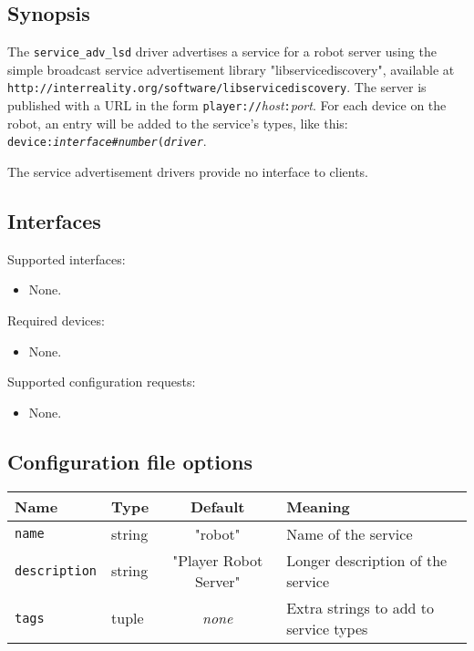 
\subsection*{Synopsis}
 The {\tt service\_adv\_lsd} driver advertises a service for a robot 
server using the simple broadcast service advertisement library
"libservicediscovery", available at 
{\tt http://interreality.org/software/libservicediscovery}.
The server is published with a URL in the form
{\tt player://}{\it host}{\tt :}{\it port}.
For each device on the robot, an entry will 
be added to the service's types, like this:
{\tt device:{\it interface}\#{\it number}({\it driver}}. 
 
The service advertisement drivers provide no interface to clients. 

\subsection*{Interfaces}

\noindent Supported interfaces:
\begin{itemize}
\item None.
\end{itemize}

\noindent Required devices:
\begin{itemize}
\item None.
\end{itemize}

\noindent Supported configuration requests:
\begin{itemize}
\item None.
\end{itemize}

\subsection*{Configuration file options}

\begin{center}
{\small \begin{tabularx}{\columnwidth}{|l|l|c|X|}
\hline
Name & Type & Default & Meaning\\
\hline
{\tt name} & string & "robot" & Name of the service\\
{\tt description} & string & "Player Robot Server" & Longer description of the service\\
{\tt tags} & tuple & {\it none} & Extra strings to add to service types \\
\hline
\end{tabularx}}
\end{center}

